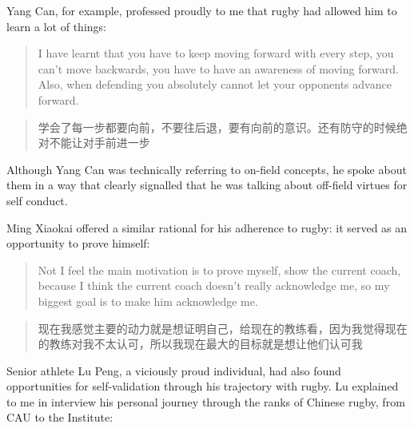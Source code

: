 \begin{CJK}{UTF8}{gbsn}
Yang Can, for example, professed proudly to me that rugby had allowed him to learn a lot of things:

\begin{quotation}
    I have learnt that you have to keep moving forward with every step, you can’t move backwards, you have to have an awareness of moving forward.  Also, when defending you absolutely cannot let your opponents advance forward.
\end{quotation}

\begin{quotation}
    学会了每一步都要向前，不要往后退，要有向前的意识。还有防守的时候绝对不能让对手前进一步
\end{quotation}

Although Yang Can was technically referring to on-field concepts, he spoke about them in a way that clearly signalled that he was talking about off-field virtues for self conduct.

Ming Xiaokai offered a similar rational for his adherence to rugby: it served as an opportunity to prove himself:

  \begin{quotation}
    Not I feel the main motivation is to prove myself, show the current coach, because I think the current coach doesn't really acknowledge me, so my biggest goal is to make him acknowledge me.
  \end{quotation}

  \begin{quotation}
    现在我感觉主要的动力就是想证明自己，给现在的教练看，因为我觉得现在的教练对我不太认可，所以我现在最大的目标就是想让他们认可我
  \end{quotation}




Senior athlete Lu Peng, a viciously proud individual, had also found opportunities for self-validation through his trajectory with rugby.  Lu explained to me in interview his personal journey through the ranks of Chinese rugby, from CAU to the Institute:


\end{CJK}
